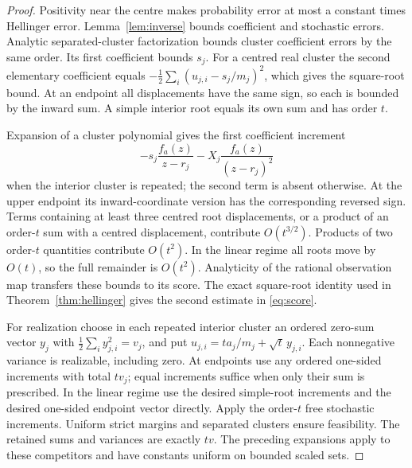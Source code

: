 \documentclass[11pt,reqno]{amsart}
\numberwithin{equation}{section}
\theoremstyle{definition}
\theoremstyle{remark}
\begin{document}
\begin{proof}
Positivity near the centre makes probability error at most a constant times Hellinger error. Lemma~\ref{lem:inverse} bounds coefficient and stochastic errors. Analytic separated-cluster factorization bounds cluster coefficient errors by the same order. Its first coefficient bounds $s_j$. For a centred real cluster the second elementary coefficient equals
$-\frac12\sum_i(u_{j,i}-s_j/m_j)^2$, which gives the square-root bound. At an endpoint all displacements have the same sign, so each is bounded by the inward sum. A simple interior root equals its own sum and has order $t$.

Expansion of a cluster polynomial gives the first coefficient increment
\[
 -s_j\frac{f_a(z)}{z-r_j}
 -X_j\frac{f_a(z)}{(z-r_j)^2}
\]
when the interior cluster is repeated; the second term is absent otherwise. At the upper endpoint its inward-coordinate version has the corresponding reversed sign. Terms containing at least three centred root displacements, or a product of an order-$t$ sum with a centred displacement, contribute $O(t^{3/2})$. Products of two order-$t$ quantities contribute $O(t^2)$. In the linear regime all roots move by $O(t)$, so the full remainder is $O(t^2)$. Analyticity of the rational observation map transfers these bounds to its score. The exact square-root identity used in Theorem~\ref{thm:hellinger} gives the second estimate in \eqref{eq:score}.

For realization choose in each repeated interior cluster an ordered zero-sum vector $y_j$ with $\frac12\sum_i y_{j,i}^2=v_j$, and put
$u_{j,i}=ta_j/m_j+\sqrt t\,y_{j,i}$. Each nonnegative variance is realizable, including zero. At endpoints use any ordered one-sided increments with total $tv_j$; equal increments suffice when only their sum is prescribed. In the linear regime use the desired simple-root increments and the desired one-sided endpoint vector directly. Apply the order-$t$ free stochastic increments. Uniform strict margins and separated clusters ensure feasibility. The retained sums and variances are exactly $tv$. The preceding expansions apply to these competitors and have constants uniform on bounded scaled sets.
\end{proof}
\end{document}
